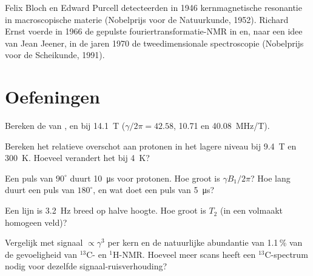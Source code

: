 \begin{history}
Felix Bloch en Edward Purcell detecteerden in 1946 kernmagnetische
resonantie in macroscopische materie (Nobelprijs voor de Natuurkunde,
1952). Richard Ernst voerde in 1966 de gepulste fouriertransformatie-NMR
in en, naar een idee van Jean Jeener, in de jaren 1970 de
tweedimensionale spectroscopie (Nobelprijs voor de Scheikunde, 1991).
\end{history}

\section{Oefeningen}

\begin{exercise}[$\star$]\label{exo:b3:advanced-nmr:1}
Bereken de  van ,  en  bij \qty{14.1}{T}
($\gamma/2\pi = 42.58$, 10.71 en \qty{40.08}{MHz/T}).
\end{exercise}

\begin{exercise}[$\star$]\label{exo:b3:advanced-nmr:2}
Bereken het relatieve overschot aan protonen in het lagere niveau bij
\qty{9.4}{T} en
\qty{300}{K}. Hoeveel verandert het bij \qty{4}{K}?
\end{exercise}

\begin{exercise}[$\star$]\label{exo:b3:advanced-nmr:3}
Een puls van $90^\circ$ duurt \qty{10}{\micro s} voor protonen. Hoe groot is
$\gamma B_1/2\pi$? Hoe lang duurt een puls van
$180^\circ$, en wat doet een puls van \qty{5}{\micro s}?
\end{exercise}

\begin{exercise}[$\star$]\label{exo:b3:advanced-nmr:4}
Een lijn is \qty{3.2}{Hz} breed op halve hoogte. Hoe groot is $T_2$ (in
een volmaakt homogeen veld)?
\end{exercise}

\begin{exercise}[$\star\star$]\label{exo:b3:advanced-nmr:5}
Vergelijk met signaal $\propto\gamma^3$ per kern en de natuurlijke
abundantie van 1.1\,\% van
 de gevoeligheid van ${}^{13}$C- en ${}^1$H-NMR. Hoeveel meer
scans heeft een ${}^{13}$C-spectrum nodig voor dezelfde
signaal-ruisverhouding?
\end{exercise}

